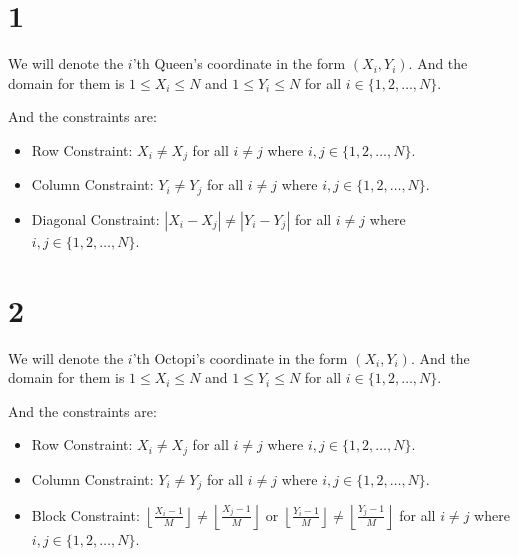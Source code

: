 \documentclass[12pt]{article}
\begin{document}
\newpage
\subsection{} 
\begin{enumerate}
\part{1} 
	We will denote the $i$'th Queen's coordinate in the form $(X_i, Y_i)$. And the domain for them is $1 \le X_i \le N$ and $1 \le Y_i \le N$ for all $i \in \{1, 2, \dots, N\}$.
	
	And the constraints are:
	
	\begin{itemize}
		\item Row Constraint:
			$X_i \neq X_j $ for all  $i \neq j$ where $i,j \in \{1, 2, \dots, N\}$.
		
		\item Column Constraint:
			$Y_i \neq Y_j $ for all  $i \neq j$ where $i,j \in \{1, 2, \dots, N\}$.
			
		\item Diagonal Constraint: 
			$|X_i - X_j| \neq |Y_i - Y_j| $ for all  $i \neq j$ where $i,j \in \{1, 2, \dots, N\}$.

	\end{itemize}
		
\part{2} 
	We will denote the $i$'th Octopi's coordinate in the form $(X_i, Y_i)$. And the domain for them is $1 \le X_i \le N$ and $1 \le Y_i \le N$ for all $i \in \{1, 2, \dots, N\}$.
	
	And the constraints are:
	
	\begin{itemize}
		\item Row Constraint:
			$X_i \neq X_j $ for all  $i \neq j$ where $i,j \in \{1, 2, \dots, N\}$.
		
		\item Column Constraint:
			$Y_i \neq Y_j $ for all  $i \neq j$ where $i,j \in \{1, 2, \dots, N\}$.
			
		\item Block Constraint: 
			$\left\lfloor \frac{X_i - 1}{M} \right\rfloor \neq \left\lfloor \frac{X_j - 1}{M} \right\rfloor$ or $\left\lfloor \frac{Y_i - 1}{M} \right\rfloor \neq \left\lfloor \frac{Y_j - 1}{M} \right\rfloor$ for all  $i \neq j$ where $i,j \in \{1, 2, \dots, N\}$.


	\end{itemize}


\end{enumerate}

\end{document}
